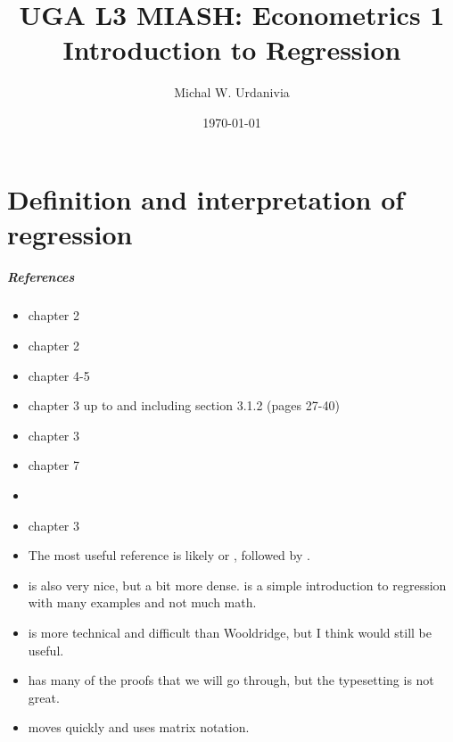 


\title[Econometrics 1: Regression]{UGA L3 MIASH: Econometrics 1\\
  \textbf{Introduction to Regression}}
\date{\today}
\author{Michal W. Urdanivia\inst{*}}




\frame{\titlepage}



\part{Definition and interpretation of regression}
\frame{\partpage}
\begin{frame}
  \tableofcontents  
\end{frame}

\begin{frame}[allowframebreaks]
  \frametitle{References}
  \begin{itemize}
  \item \cite{ap2014} chapter 2
  \item \cite{w2013} chapter 2    
  \item \cite{sw2009} chapter 4-5
  \item \cite{ap2009} chapter 3 up to and including section 3.1.2
    (pages 27-40)
  \item \cite{abbring2001} chapter 3
  \item \cite{dbc2012} chapter 7
  \item \cite{bierens2010sreg}
  \item \cite{baltagi2002} chapter 3
 \framebreak 
\item The most useful reference is likely \cite{w2013} or \cite{sw2009},
followed by \cite{ap2014}. 
\item \cite{ap2009} is also very nice, but a bit
more dense. \cite{dbc2012} is a simple introduction to regression with
many examples and not much math. 
\item \cite{baltagi2002}  is more technical and difficult than
Wooldridge, but I think would still be useful. 
\item  \cite{bierens2010sreg}
has many of the proofs that we will go through, but the typesetting is
not great.  
\item \cite{abbring2001} moves quickly and uses matrix
notation. 
\end{itemize}
\end{frame}

